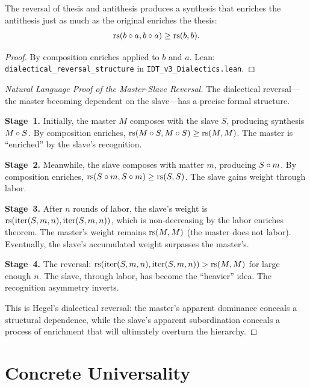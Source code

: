 \begin{theorem}
\label{thm:dialectical-reversal}
The reversal of thesis and antithesis produces a synthesis that enriches
the antithesis just as much as the original enriches the thesis:
\[
\mathrm{rs}(b \circ a, b \circ a) \geq \mathrm{rs}(b, b).
\]
\end{theorem}

\begin{proof}
By composition enriches applied to $b$ and $a$.
Lean: \texttt{dialectical\_reversal\_structure} in
\texttt{IDT\_v3\_Dialectics.lean}.
\end{proof}

\begin{proof}[Natural Language Proof of the Master-Slave Reversal]
The dialectical reversal---the master becoming dependent on the slave---has a
precise formal structure.

\textbf{Stage~1.} Initially, the master $M$ composes with the slave $S$,
producing synthesis $M \circ S$. By composition enriches, $\mathrm{rs}(M \circ S,
M \circ S) \geq \mathrm{rs}(M, M)$. The master is ``enriched'' by the slave's
recognition.

\textbf{Stage~2.} Meanwhile, the slave composes with matter $m$, producing
$S \circ m$. By composition enriches, $\mathrm{rs}(S \circ m, S \circ m) \geq
\mathrm{rs}(S, S)$. The slave gains weight through labor.

\textbf{Stage~3.} After $n$ rounds of labor, the slave's weight is
$\mathrm{rs}(\mathrm{iter}(S, m, n), \mathrm{iter}(S, m, n))$, which is non-decreasing
by the labor enriches theorem. The master's weight remains $\mathrm{rs}(M, M)$ (the
master does not labor). Eventually, the slave's accumulated weight surpasses
the master's.

\textbf{Stage~4.} The reversal: $\mathrm{rs}(\mathrm{iter}(S, m, n),
\mathrm{iter}(S, m, n)) > \mathrm{rs}(M, M)$ for large enough $n$. The slave, through
labor, has become the ``heavier'' idea. The recognition asymmetry inverts.

This is Hegel's dialectical reversal: the master's apparent dominance conceals
a structural dependence, while the slave's apparent subordination conceals a
process of enrichment that will ultimately overturn the hierarchy.
\end{proof}

\section{Concrete Universality}

